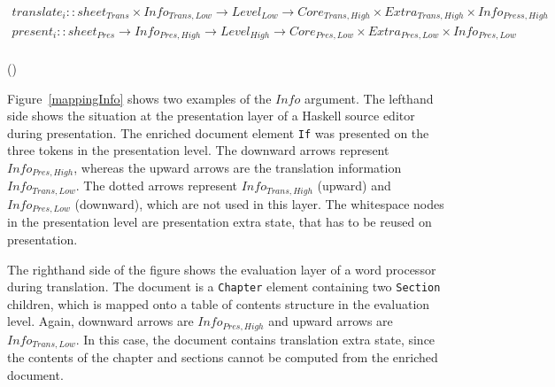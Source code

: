 \bc
\begin{small}\begin{align*}
translate_{i} :: sheet_{Trans} \times Info_{Trans,Low} \rightarrow Level_{Low} \rightarrow Core_{Trans,High}  \times Extra_{Trans,High}  \times Info_{Press,High}\\
present_{i} :: sheet_{Pres}  \rightarrow Info_{Pres,High} \rightarrow  Level_{High} \rightarrow Core_{Pres,Low} \times Extra_{Pres,Low}   \times Info_{Pres,Low} \\
\end{align*} 
\end{small}
{\centering ()\\}


Figure~\ref{mappingInfo} shows two examples of the $Info$ argument. The lefthand side shows the situation at the presentation layer of a Haskell source editor during presentation.  The enriched document element \verb|If|  was presented on the three tokens in the presentation level. The downward arrows represent $Info_{Pres,High}$, whereas the upward arrows are the translation information $Info_{Trans, Low}$. The dotted arrows represent $Info_{Trans,High}$ (upward) and $Info_{Pres,Low}$ (downward), which are not used in this layer. The whitespace nodes in the presentation level are presentation extra state, that has to be reused on presentation. 

The righthand side of the figure shows the evaluation layer of a word processor during translation. The document is a \verb|Chapter| element containing two \verb|Section| children, which is mapped onto a table of contents structure in the evaluation level. Again, downward arrows are $Info_{Pres,High}$ and upward arrows are $Info_{Trans,Low}$.  In this case, the document contains translation extra state, since the contents of the chapter and sections cannot be computed from the enriched document.  

